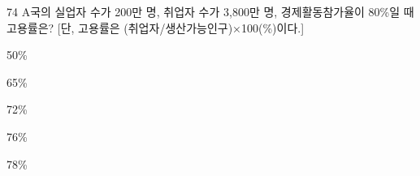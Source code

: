 \begin{question}{74}
A국의 실업자 수가 200만 명, 취업자 수가 3,800만 명, 경제활동참가율이 80\%일 때 고용률은? [단, 고용률은 (취업자/생산가능인구)×100(\%)이다.]
\begin{choices}
  \item 50\%
  \item 65\%
  \item 72\%
  \item 76\%
  \item 78\%
\end{choices}
\end{question}
